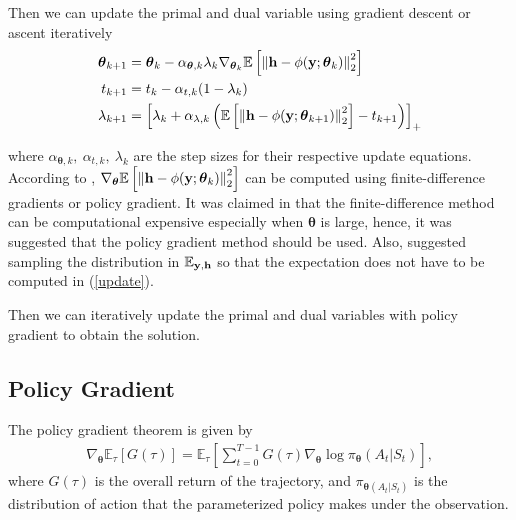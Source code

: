 \documentclass[journal,10pt,twocolumn]{IEEEtran}
\begin{document}
        Then we can update the primal and dual variable using gradient descent or ascent iteratively
        \begin{align} \label{update}
            \boldsymbol{\theta}_{k+1} &= \boldsymbol{\theta}_{k} - 
                \alpha_{\boldsymbol{\theta},k} \lambda_k \nabla_{\boldsymbol{\theta}_k}
                \mathbb{E}\left[\left\| {\bf h}-\phi(\mathbf{y};\boldsymbol{\theta}_k) \right\|^2_2 \right]\\
            t_{k+1} &= t_{k} - \alpha_{t,k}(1-\lambda_k)\\
            \lambda_{k+1} &= \left[ \lambda_k + \alpha_{\lambda,k}
                \left( \mathbb{E}\left[\left\| {\bf h}-\phi(\mathbf{y};\boldsymbol{\theta}_{k+1}) \right\|^2_2 \right] 
                -t_{k+1}\right)\right]_{+}
        \end{align}

        where $\alpha_{\boldsymbol{\theta},k},~ \alpha_{t,k},~ \lambda_k$ are the step sizes for their respective update equations.
        According to \cite{Eisen2019journal}, $\nabla_{\boldsymbol{\theta}}\mathbb{E}\left[\left\| {\bf h}-\phi(\mathbf{y};\boldsymbol{\theta}_k) \right\|^2_2 \right]$ 
        can be computed using finite-difference gradients or policy gradient.
        It was claimed in \cite{Eisen2019journal} that the finite-difference method can be
        computational expensive especially when $\boldsymbol{\theta}$ is large, hence, it was suggested that the policy gradient method should be used.
        Also, \cite{Eisen2020} suggested sampling the distribution in $\mathbb{E}_{{\bf y},{\bf h}}$ so that the expectation does not have to be computed in (\ref{update}).

        Then we can iteratively update the primal and dual variables with policy gradient to obtain the solution.
    
        
    \subsection{Policy Gradient}
        The policy gradient theorem is given by
        \begin{align*}
            \nabla_{\boldsymbol{\theta}}\mathbb{E}_{\tau}[G(\tau)]
                =\mathbb{E}_{\tau}\left[\sum\limits_{t=0}^{T-1}G(\tau)
                \nabla_{\boldsymbol{\theta}}\log{\pi_{\boldsymbol{\theta}}
                (A_t|S_t)}\right],
        \end{align*}
        where $G(\tau)$ is the overall return of the trajectory, and $\pi_{\boldsymbol{\theta}(A_t|S_t)}$ is the distribution of action that 
        the parameterized policy makes under the observation. 
\end{document}

